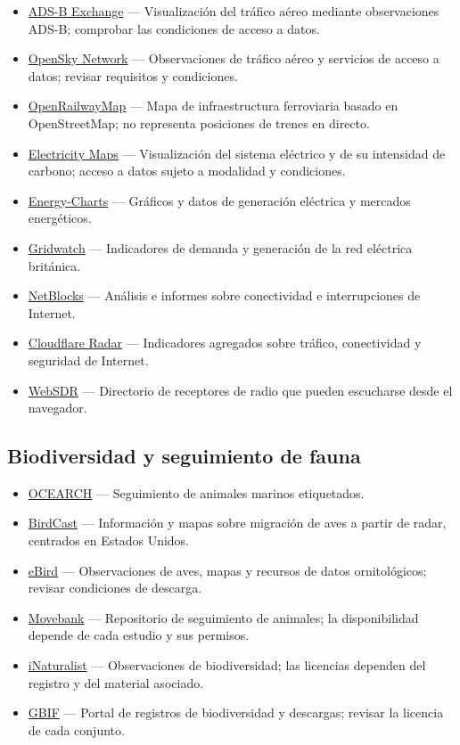 \documentclass[
  letterpaper,
  DIV=11,
  numbers=noendperiod]{scrartcl}
\providecommand{\tightlist}{%
  \setlength{\itemsep}{0pt}\setlength{\parskip}{0pt}}
\begin{document}
\begin{itemize}
\tightlist
\item
  \href{https://adsbexchange.com/}{ADS-B Exchange} --- Visualización del
  tráfico aéreo mediante observaciones ADS-B; comprobar las condiciones
  de acceso a datos.
\item
  \href{https://opensky-network.org/}{OpenSky Network} --- Observaciones
  de tráfico aéreo y servicios de acceso a datos; revisar requisitos y
  condiciones.
\item
  \href{https://openrailwaymap.org/}{OpenRailwayMap} --- Mapa de
  infraestructura ferroviaria basado en OpenStreetMap; no representa
  posiciones de trenes en directo.
\item
  \href{https://electricitymaps.com/}{Electricity Maps} ---
  Visualización del sistema eléctrico y de su intensidad de carbono;
  acceso a datos sujeto a modalidad y condiciones.
\item
  \href{https://energy-charts.info/}{Energy-Charts} --- Gráficos y datos
  de generación eléctrica y mercados energéticos.
\item
  \href{https://gridwatch.co.uk/}{Gridwatch} --- Indicadores de demanda
  y generación de la red eléctrica británica.
\item
  \href{https://netblocks.org/}{NetBlocks} --- Análisis e informes sobre
  conectividad e interrupciones de Internet.
\item
  \href{https://radar.cloudflare.com/}{Cloudflare Radar} --- Indicadores
  agregados sobre tráfico, conectividad y seguridad de Internet.
\item
  \href{https://websdr.org/}{WebSDR} --- Directorio de receptores de
  radio que pueden escucharse desde el navegador.
\end{itemize}

\subsection{Biodiversidad y seguimiento de
fauna}\label{biodiversidad-y-seguimiento-de-fauna}

\begin{itemize}
\tightlist
\item
  \href{https://ocearch.org/}{OCEARCH} --- Seguimiento de animales
  marinos etiquetados.
\item
  \href{https://birdcast.info/}{BirdCast} --- Información y mapas sobre
  migración de aves a partir de radar, centrados en Estados Unidos.
\item
  \href{https://ebird.org/}{eBird} --- Observaciones de aves, mapas y
  recursos de datos ornitológicos; revisar condiciones de descarga.
\item
  \href{https://movebank.org/}{Movebank} --- Repositorio de seguimiento
  de animales; la disponibilidad depende de cada estudio y sus permisos.
\item
  \href{https://inaturalist.org/}{iNaturalist} --- Observaciones de
  biodiversidad; las licencias dependen del registro y del material
  asociado.
\item
  \href{https://gbif.org/}{GBIF} --- Portal de registros de
  biodiversidad y descargas; revisar la licencia de cada conjunto.
\end{itemize}
\end{document}
